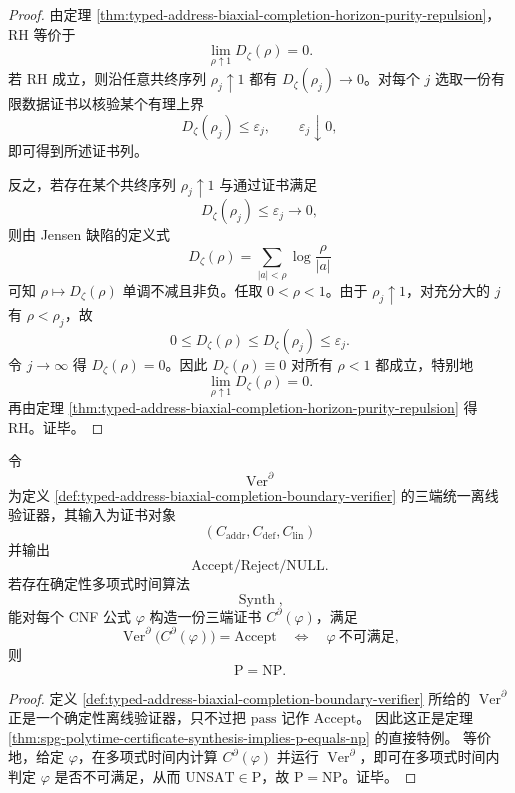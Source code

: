 \begin{proof}
由定理 \ref{thm:typed-address-biaxial-completion-horizon-purity-repulsion}，RH 等价于
\[
\lim_{\rho\uparrow 1}D_\zeta(\rho)=0.
\]
若 RH 成立，则沿任意共终序列 \(\rho_j\uparrow 1\) 都有 \(D_\zeta(\rho_j)\to 0\)。对每个 \(j\) 选取一份有限数据证书以核验某个有理上界
\[
D_\zeta(\rho_j)\le \varepsilon_j,
\qquad
\varepsilon_j\downarrow 0,
\]
即可得到所述证书列。

反之，若存在某个共终序列 \(\rho_j\uparrow 1\) 与通过证书满足
\[
D_\zeta(\rho_j)\le \varepsilon_j\to 0,
\]
则由 Jensen 缺陷的定义式
\[
D_\zeta(\rho)=\sum_{|a|<\rho}\log\frac{\rho}{|a|}
\]
可知 \(\rho\mapsto D_\zeta(\rho)\) 单调不减且非负。任取 \(0<\rho<1\)。由于 \(\rho_j\uparrow 1\)，对充分大的 \(j\) 有 \(\rho<\rho_j\)，故
\[
0\le D_\zeta(\rho)\le D_\zeta(\rho_j)\le \varepsilon_j.
\]
令 \(j\to\infty\) 得 \(D_\zeta(\rho)=0\)。因此 \(D_\zeta(\rho)\equiv 0\) 对所有 \(\rho<1\) 都成立，特别地
\[
\lim_{\rho\uparrow 1}D_\zeta(\rho)=0.
\]
再由定理 \ref{thm:typed-address-biaxial-completion-horizon-purity-repulsion} 得 RH。证毕。
\end{proof}

\begin{theorem}[统一离线验证器的多项式证书合成壁垒]\label{thm:conclusion-unified-offline-verifier-synthesis-barrier}
令
\[
\operatorname{Ver}^{\partial}
\]
为定义 \ref{def:typed-address-biaxial-completion-boundary-verifier} 的三端统一离线验证器，其输入为证书对象
\[
(C_{\mathrm{addr}},C_{\mathrm{def}},C_{\mathrm{lin}})
\]
并输出
\[
\mathrm{Accept}/\mathrm{Reject}/\mathrm{NULL}.
\]
若存在确定性多项式时间算法
\[
\operatorname{Synth},
\]
能对每个 CNF 公式 \(\varphi\) 构造一份三端证书 \(C^\partial(\varphi)\)，满足
\[
\operatorname{Ver}^{\partial}\!\bigl(C^\partial(\varphi)\bigr)=\mathrm{Accept}
\quad\Longleftrightarrow\quad
\varphi\ \text{不可满足},
\]
则
\[
\mathrm{P}=\mathrm{NP}.
\]
\end{theorem}

\begin{proof}
定义 \ref{def:typed-address-biaxial-completion-boundary-verifier} 所给的 \(\operatorname{Ver}^{\partial}\) 正是一个确定性离线验证器，只不过把 \(\mathrm{pass}\) 记作 \(\mathrm{Accept}\)。
因此这正是定理 \ref{thm:spg-polytime-certificate-synthesis-implies-p-equals-np} 的直接特例。
等价地，给定 \(\varphi\)，在多项式时间内计算 \(C^\partial(\varphi)\) 并运行 \(\operatorname{Ver}^{\partial}\)，即可在多项式时间内判定 \(\varphi\) 是否不可满足，从而 \(\mathrm{UNSAT}\in\mathrm{P}\)，故 \(\mathrm{P}=\mathrm{NP}\)。证毕。
\end{proof}


